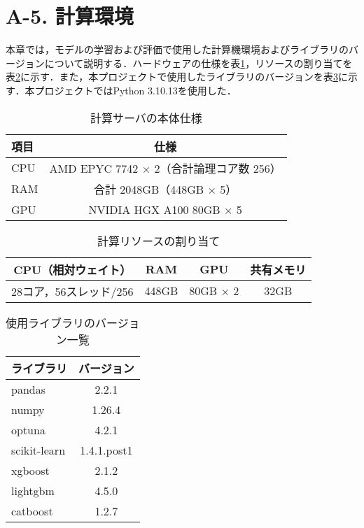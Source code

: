 \section*{A-5. 計算環境}
本章では，モデルの学習および評価で使用した計算機環境およびライブラリのバージョンについて説明する．ハードウェアの仕様を表\ref{tab:server_specs}，リソースの割り当てを表\ref{tab:resource_allocation}に示す．また，本プロジェクトで使用したライブラリのバージョンを表\ref{tab:versions}に示す．本プロジェクトではPython 3.10.13を使用した．
\begin{table}[tb]
    \centering
    \doublerulesep=0.3pt
    \caption{計算サーバの本体仕様}
    \label{tab:server_specs}
    \begin{tabular}{l|c}
        \hline\hline\hline
        項目 & 仕様 \\
        \hline
        CPU  & AMD EPYC 7742 × 2（合計論理コア数 256） \\
        RAM  & 合計 2048GB（448GB × 5） \\
        GPU  & NVIDIA HGX A100 80GB × 5 \\
        \hline\hline\hline
    \end{tabular}
\end{table}

\begin{table}[tb]
    \centering
    \doublerulesep=0.3pt
    \caption{計算リソースの割り当て}
    \label{tab:resource_allocation}
    \begin{tabular}{c|c|c|c}
        \hline\hline\hline
        CPU（相対ウェイト） & RAM & GPU & 共有メモリ \\
        \hline
        28コア，56スレッド/256 & 448GB & 80GB × 2 & 32GB  \\
        \hline\hline\hline
    \end{tabular}
\end{table}

\begin{table}[tb]
    \centering
    \doublerulesep=0.3pt
    \caption{使用ライブラリのバージョン一覧}
    \label{tab:versions}
    \begin{tabular}{l|c}
        \hline\hline\hline
        ライブラリ & バージョン \\
        \hline
        pandas & 2.2.1 \\
        numpy & 1.26.4 \\
        optuna & 4.2.1 \\
        scikit-learn & 1.4.1.post1 \\
        xgboost & 2.1.2 \\
        lightgbm & 4.5.0 \\
        catboost & 1.2.7 \\
        \hline\hline\hline
    \end{tabular}
\end{table}

